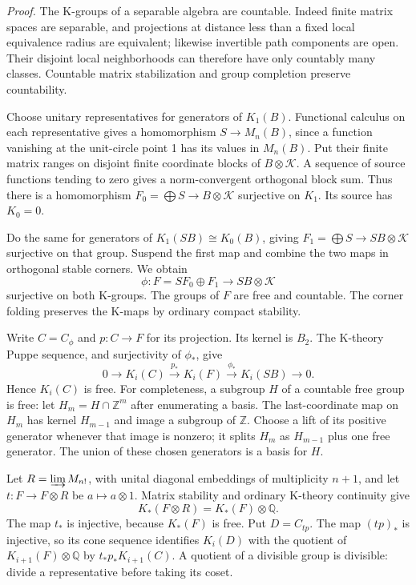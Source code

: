 \documentclass[
  11pt,
]{article}
\begin{document}
\emph{Proof.} The K-groups of a separable algebra are countable. Indeed
finite matrix spaces are separable, and projections at distance less
than a fixed local equivalence radius are equivalent; likewise
invertible path components are open. Their disjoint local neighborhoods
can therefore have only countably many classes. Countable matrix
stabilization and group completion preserve countability.

Choose unitary representatives for generators of \(K_1(B)\). Functional
calculus on each representative gives a homomorphism \(S\to M_n(B)\),
since a function vanishing at the unit-circle point 1 has its values in
\(M_n(B)\). Put their finite matrix ranges on disjoint finite coordinate
blocks of \(B\otimes\mathcal K\). A sequence of source functions tending
to zero gives a norm-convergent orthogonal block sum. Thus there is a
homomorphism \(F_0=\bigoplus S\to B\otimes\mathcal K\) surjective on
\(K_1\). Its source has \(K_0=0\).

Do the same for generators of \(K_1(SB)\cong K_0(B)\), giving
\(F_1=\bigoplus S\to SB\otimes\mathcal K\) surjective on that group.
Suspend the first map and combine the two maps in orthogonal stable
corners. We obtain \[
\phi:F=SF_0\oplus F_1\longrightarrow SB\otimes\mathcal K
\tag{10.6}
\] surjective on both K-groups. The groups of \(F\) are free and
countable. The corner folding preserves the K-maps by ordinary compact
stability.

Write \(C=C_\phi\) and \(p:C\to F\) for its projection. Its kernel is
\(B_2\). The K-theory Puppe sequence, and surjectivity of \(\phi_*\),
give \[
0\longrightarrow K_i(C)\xrightarrow{p_*}K_i(F)
\xrightarrow{\phi_*}K_i(SB)\longrightarrow0.
\tag{10.7}
\] Hence \(K_i(C)\) is free. For completeness, a subgroup \(H\) of a
countable free group is free: let \(H_m=H\cap\mathbb Z^m\) after
enumerating a basis. The last-coordinate map on \(H_m\) has kernel
\(H_{m-1}\) and image a subgroup of \(\mathbb Z\). Choose a lift of its
positive generator whenever that image is nonzero; it splits \(H_m\) as
\(H_{m-1}\) plus one free generator. The union of these chosen
generators is a basis for \(H\).

Let \(R=\varinjlim M_{n!}\), with unital diagonal embeddings of
multiplicity \(n+1\), and let \(t:F\to F\otimes R\) be
\(a\mapsto a\otimes1\). Matrix stability and ordinary K-theory
continuity give \[
K_*(F\otimes R)=K_*(F)\otimes\mathbb Q.
\tag{10.8}
\] The map \(t_*\) is injective, because \(K_*(F)\) is free. Put
\(D=C_{tp}\). The map \((tp)_*\) is injective, so its cone sequence
identifies \(K_i(D)\) with the quotient of
\(K_{i+1}(F)\otimes\mathbb Q\) by \(t_*p_*K_{i+1}(C)\). A quotient of a
divisible group is divisible: divide a representative before taking its
coset.
\end{document}
